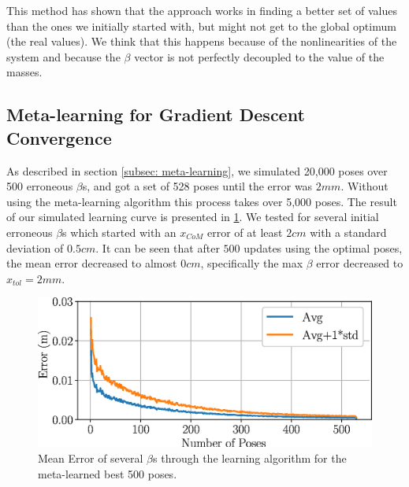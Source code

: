 \documentclass[letterpaper, 10 pt, conference]{ieeeconf}
\newcommand{\Bogdan}[1]{\textcolor{red}{\textbf{Bogdan:} #1}}
\begin{document}
This method has shown that the approach works in finding a better set of values
than the ones we initially started with, but might not get to the global optimum
(the real values). We think that this happens because of the nonlinearities of
the system and because the $\beta$ vector is not perfectly decoupled to the
value of the masses.

\subsection{Meta-learning for Gradient Descent Convergence}
\label{subsec:Meta-learning}
As described in section \ref{subsec: meta-learning}, we simulated 20,000 poses
over 500 erroneous $\beta$s, and got a set of 528 poses until the error was
$2mm$. Without using the meta-learning algorithm this process takes  over 5,000
poses. The result of our simulated learning curve is presented in
\cref{fig:Error_sim}. We tested for several initial erroneous $\beta$s which
started with an $x_{CoM}$ error of at least $2 cm$ with a standard deviation of
$0.5 cm$. It can be seen that after $500$ updates using the optimal poses, the
mean error decreased to almost $0 cm$, specifically the max $\beta$ error
decreased to $x_{tol} = 2mm$.
\begin{figure} [htb]
\centering
\includegraphics[width=0.8\columnwidth]{figs/Simulation_results.eps}
\vspace{-0.8\baselineskip}
\caption{\label{fig:Error_sim} Mean Error of several $\beta$s through the
learning algorithm for the meta-learned best 500 poses.}
\end{figure}
\end{document}
